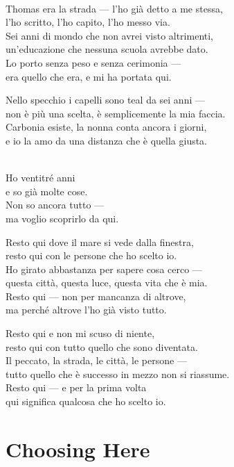 \begin{lyrics}
\\
Thomas era la strada — l'ho già detto a me stessa,\\
l'ho scritto, l'ho capito, l'ho messo via.\\
Sei anni di mondo che non avrei visto altrimenti,\\
un'educazione che nessuna scuola avrebbe dato.\\
Lo porto senza peso e senza cerimonia —\\
era quello che era, e mi ha portata qui.

Nello specchio i capelli sono teal da sei anni —\\
non è più una scelta, è semplicemente la mia faccia.\\
Carbonia esiste, la nonna conta ancora i giorni,\\
e io la amo da una distanza che è quella giusta.

\\
Ho ventitré anni\\
e so già molte cose.\\
Non so ancora tutto —\\
ma voglio scoprirlo da qui.

Resto qui dove il mare si vede dalla finestra,\\
resto qui con le persone che ho scelto io.\\
Ho girato abbastanza per sapere cosa cerco —\\
questa città, questa luce, questa vita che è mia.\\
Resto qui — non per mancanza di altrove,\\
ma perché altrove l'ho già visto tutto.

Resto qui e non mi scuso di niente,\\
resto qui con tutto quello che sono diventata.\\
Il peccato, la strada, le città, le persone —\\
tutto quello che è successo in mezzo non si riassume.
\\
Resto qui — e per la prima volta\\
qui significa qualcosa che ho scelto io.

\end{lyrics}

\section{Choosing Here}

